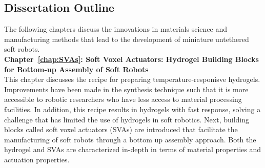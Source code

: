 {\begin{figure}[!ht]
      \caption[]{}
      \label{fig:summary}
\end{figure}

\subsection{Dissertation Outline}
The following chapters discuss the innovations in materials science and manufacturing methods that lead to the development of miniature untethered soft robots.\\ 
\textbf{Chapter~\ref{chap:SVAs}: Soft Voxel Actuators: Hydrogel Building Blocks for Bottom-up Assembly of Soft Robots}\\
This chapter discusses the recipe for preparing temperature-responisve hydrogels. Improvements have been made in the synthesis technique such that it is more accessible to robotic researchers who have less access to material processing facilities. In addition, this recipe results in hydrogels with fast response, solving a challenge that has limited the use of hydrogels in soft robotics. Next, building blocks called soft voxel actuators (SVAs) are introduced that facilitate the manufacturing of soft robots through a bottom up assembly approach. Both the hydrogel and SVAs are characterized in-depth in terms of material properties and actuation properties.
  
}
